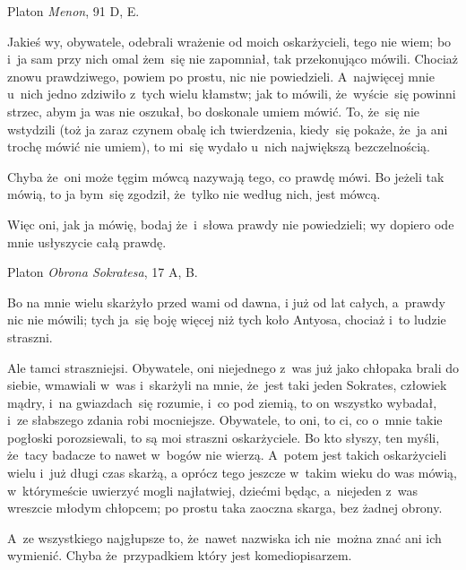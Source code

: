 \documentclass[a4paper,11pt]{article}
\newcommand{\attribA}[1]{#1}
\begin{document}
\attribA{Platon \textit{Menon}, 91 D, E.}

\vspace{\spaceThree}



Jakieś wy, obywatele, odebrali wrażenie od moich oskarżycieli, tego
nie wiem; bo i~ja sam przy nich omal żem~się nie zapomniał, tak
przekonująco mówili. Chociaż znowu prawdziwego, powiem po prostu, nic
nie powiedzieli. A~najwięcej mnie u~nich jedno zdziwiło z~tych wielu
kłamstw; jak to mówili, że~wyście~się powinni strzec, abym ja was nie
oszukał, bo doskonale umiem mówić. To, że~się nie wstydzili (toż ja
zaraz czynem obalę ich twierdzenia, kiedy~się pokaże, że~ja ani trochę
mówić nie umiem), to mi~się wydało u~nich największą bezczelnością.

Chyba że~oni może tęgim mówcą nazywają tego, co prawdę mówi. Bo jeżeli
tak mówią, to ja bym~się zgodził, że~tylko nie według nich, jest
mówcą.

Więc oni, jak ja mówię, bodaj że~i~słowa prawdy nie powiedzieli; wy
dopiero ode mnie usłyszycie całą prawdę.


\attribA{Platon \textit{Obrona Sokratesa}, 17 A, B.}

\vspace{\spaceThree}



Bo na mnie wielu skarżyło przed wami od dawna, i już od lat całych,
a~prawdy nic nie mówili; tych ja~się boję więcej niż tych koło
Antyosa, chociaż i~to ludzie straszni.

Ale tamci straszniejsi. Obywatele, oni niejednego z~was już jako
chłopaka brali do siebie, wmawiali w~was i~skarżyli na mnie, że~jest
taki jeden Sokrates, człowiek mądry, i~na gwiazdach~się rozumie, i~co
pod ziemią, to on wszystko wybadał, i~ze słabszego zdania robi
mocniejsze. Obywatele, to oni, to ci, co o~mnie takie pogłoski
porozsiewali, to są moi straszni oskarżyciele. Bo kto słyszy, ten
myśli, że~tacy badacze to nawet w~bogów nie wierzą. A~potem jest
takich oskarżycieli wielu i~już długi czas skarżą, a oprócz tego
jeszcze w~takim wieku do was mówią, w~którymeście uwierzyć mogli
najłatwiej, dziećmi będąc, a~niejeden z~was wreszcie młodym chłopcem;
po prostu taka zaoczna skarga, bez żadnej obrony.

A~ze wszystkiego najgłupsze to, że~nawet nazwiska ich nie~można znać
ani ich wymienić. Chyba że~przypadkiem który jest komediopisarzem.
\end{document}
